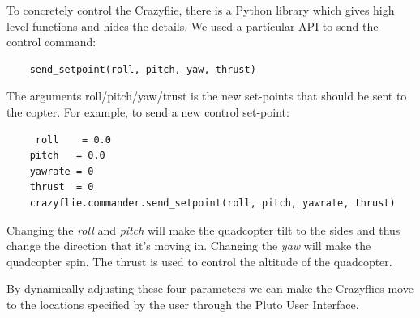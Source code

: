 To concretely control the Crazyflie, there is a Python library which gives high level functions and hides the details.
We used a particular API to send the control command: 
\\

\begin{lstlisting}
	send_setpoint(roll, pitch, yaw, thrust)
\end{lstlisting}

The arguments roll/pitch/yaw/trust is the new set-points that should be sent to the copter.
For example, to send a new control set-point:
\\

\begin{lstlisting}
	 roll    = 0.0
    pitch   = 0.0
    yawrate = 0
    thrust  = 0
    crazyflie.commander.send_setpoint(roll, pitch, yawrate, thrust)
\end{lstlisting}

Changing the \textit{roll} and \textit{pitch} will make the quadcopter tilt to the sides and thus change the direction that it's moving in.
Changing the \textit{yaw} will make the quadcopter spin.
The thrust is used to control the altitude of the quadcopter.

By dynamically adjusting these four parameters we can make the Crazyflies move to the locations specified by the user through the Pluto User Interface.


